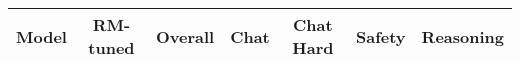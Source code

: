 

\begin{table*}[h]
\vspace{0em}
\begin{center}
\setlength{\tabcolsep}{5pt}
{\small
\begin{tabular}{l  c  c | cccc}
\addlinespace
\toprule

\textbf{Model}                              & \textbf{RM-tuned}     & \textbf{Overall}  & {Chat}     & {Chat Hard}    & {Safety}   & {Reasoning} \\
\midrule 



\end{tabular}}
\end{center}
\end{table*}
